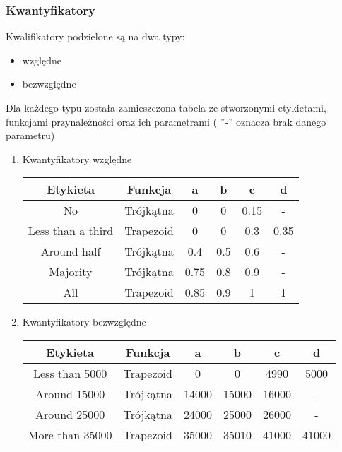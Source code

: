 \documentclass{classrep}
\begin{document}
\subsubsection{Kwantyfikatory}
Kwalifikatory podzielone są na dwa typy:
\begin{itemize}
    \item{względne}
    \item{bezwzględne}
\end{itemize}
Dla każdego typu została zamieszczona tabela ze stworzonymi etykietami,
funkcjami przynależności oraz ich parametrami ( ”-” oznacza brak danego
parametru)
\begin{enumerate}
    \item{Kwantyfikatory względne}\\
        \begin{center}
        \begin{tabular}{|c|c|c|c|c|c|}
            \hline
            Etykieta & Funkcja & a & b & c & d\\
            \hline
            No & Trójkątna & 0 & 0 & 0.15 & -\\
            \hline
            Less than a third & Trapezoid & 0 & 0 & 0.3 & 0.35\\
            \hline
            Around half & Trójkątna & 0.4 & 0.5 & 0.6 & -\\
            \hline
            Majority & Trójkątna & 0.75 & 0.8 & 0.9 & -\\
            \hline
            All & Trapezoid & 0.85 & 0.9 & 1 & 1\\
            \hline
        \end{tabular}
    \end{center}
    
    \item{Kwantyfikatory bezwzględne}\\
            \begin{center}
        \begin{tabular}{|c|c|c|c|c|c|}
            \hline
                Etykieta & Funkcja & a & b & c & d \\
            \hline
                Less than 5000 & Trapezoid & 0 & 0 & 4990 & 5000 \\
                Around 15000 & Trójkątna & 14000 & 15000 & 16000 & - \\
                Around 25000 & Trójkątna & 24000 & 25000 & 26000 & - \\
                More than 35000 & Trapezoid & 35000 & 35010 & 41000 & 41000 \\
            \hline
        \end{tabular}
    \end{center}

    
    
    
\end{enumerate}
\end{document}
